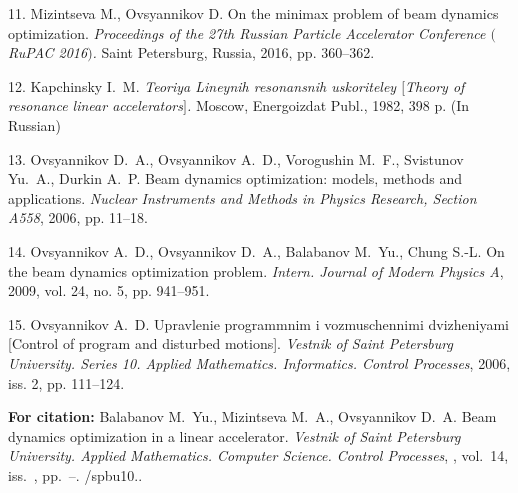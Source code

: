 {11. Mizintseva M., Ovsyannikov D. On the minimax problem of beam
dynamics optimization. \textit{Proceedings of the 27th Russian
Particle Accelerator Conference $($RuPAC 2016$)$.} Saint
Petersburg, Russia, 2016, pp. 360--362.

12. Kapchinsky I.~M. {\it Teoriya Lineynih resonansnih uskoriteley
$[$Theory of resonance linear accelerators$]$.} Moscow,
Energoizdat Publ., 1982, 398 p. (In Russian)

13. Ovsyannikov D.~A., Ovsyannikov A.~D., Vorogushin M.~F.,
Svistunov Yu.~A., Durkin A.~P. Beam dynamics optimization: models,
methods and applications. \textit{Nuclear Instruments and Methods
in Physics Research, Section A558}, 2006, pp. 11--18.

14. Ovsyannikov A.~D., Ovsyannikov D.~A., Balabanov M.~Yu., Chung
S.-L. On the beam dynamics optimization problem. \textit{Intern.
Journal of Modern Physics A}, 2009, vol. 24, no. 5, pp. 941--951.

15. Ovsyannikov A.~D. Upravlenie programmnim i vozmuschennimi
dvizheniyami [Control of program and disturbed motions]. \textit
{Vestnik of Saint Petersburg University. Series 10. Applied
Mathematics. Informatics. Control Processes}, 2006, iss. 2, pp.
111--124.





\vskip 2mm

{\bf For citation:}  Balabanov M.~Yu., Mizintseva M.~A.,
Ovsyannikov D.~A. Beam dynamics optimization in a linear
accelerator. {\it Vestnik of Saint Petersburg University. Applied
Mathematics. Computer Science. Control Processes}, \issueyear,
vol.~14, iss.~\issuenum, pp.~\pageref{p1}--\pageref{p1e}.
\doivyp/spbu10.\issueyear.


}
